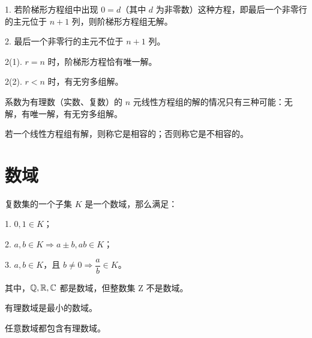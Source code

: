 1. 若阶梯形方程组中出现 $0=d$（其中 $d$ 为非零数）这种方程，即最后一个非零行的主元位于 $n+1$ 列，则阶梯形方程组无解。

2. 最后一个非零行的主元不位于 $n+1$ 列。

2(1). $r=n$ 时，阶梯形方程恰有唯一解。

2(2). $r<n$ 时，有无穷多组解。

\begin{theorem}
	系数为有理数（实数、复数）的 $n$ 元线性方程组的解的情况只有三种可能：无解，有唯一解，有无穷多组解。
\end{theorem}

若一个线性方程组有解，则称它是相容的；否则称它是不相容的。

\section{数域}

\begin{definition}
	复数集的一个子集 $K$ 是一个数域，那么满足：
	
	1. $0,1\in K$；
	
	2. $a,b\in K \Rightarrow a \pm b,ab\in K$；
	
	3. $a,b \in K$，且 $b\ne 0 \Rightarrow \dfrac{a}{b}\in K$。
\end{definition}

其中，$\mathbb{Q},\mathbb{R},\mathbb{C}$ 都是数域，但整数集 $\mathrm{Z}$ 不是数域。

有理数域是最小的数域。

\begin{theorem}
	任意数域都包含有理数域。
\end{theorem}


